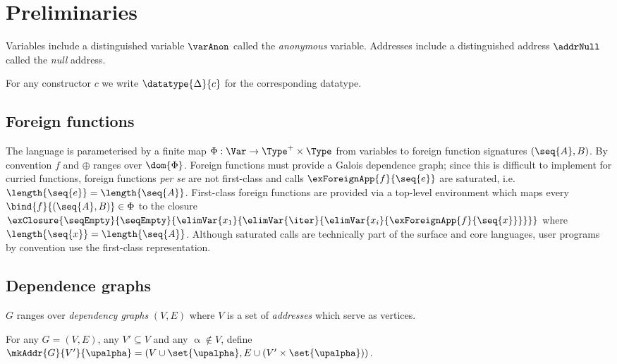 \section{Preliminaries}



Variables include a distinguished variable $\varAnon$ called the \emph{anonymous}
variable. Addresses include a distinguished address $\addrNull$ called the \emph{null} address.

For any constructor $c$ we write $\datatype{\Delta}{c}$ for the corresponding datatype.

\subsection{Foreign functions}

The language is parameterised by a finite map $\Phi: \Var \to \Type^+ \times \Type$ from variables to foreign
function signatures $(\seq{A}, B)$. By convention $f$ and $\oplus$ ranges over $\dom{\Phi}$. Foreign functions
must provide a Galois dependence graph; since this is difficult to implement for curried functions,
foreign functions \emph{per se} are not first-class and calls $\exForeignApp{f}{\seq{e}}$ are saturated,
i.e.~$\length{\seq{e}} = \length{\seq{A}}$. First-class foreign functions are provided via a top-level
environment which maps every $\bind{f}{(\seq{A}, B)} \in \Phi$ to the closure
$\exClosure{\seqEmpty}{\seqEmpty}{\elimVar{x_1}{\elimVar{\iter}{\elimVar{x_i}{\exForeignApp{f}{\seq{x}}}}}}$
where $\length{\seq{x}} = \length{\seq{A}}$. Although saturated calls are technically part of the surface and
core languages, user programs by convention use the first-class representation.

\subsection{Dependence graphs}

$G$ ranges over \emph{dependency graphs} $(V, E)$ where $V$ is a set of
\emph{addresses} which serve as vertices.

\begin{definition}
   For any $G = (V, E)$, any $V' \subseteq V$ and any $\upalpha \notin V$, define $\mkAddr{G}{V'}{\upalpha} = (V \cup \set{\upalpha}, E \cup (V' \times \set{\upalpha}))$.
\end{definition}
